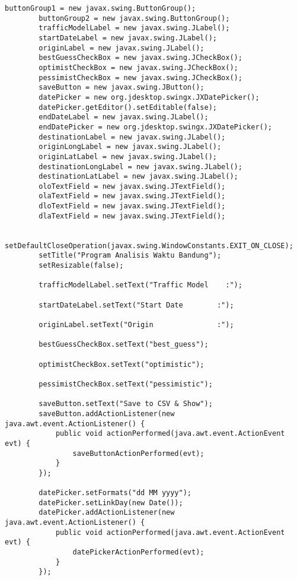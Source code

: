 \begin{lstlisting}[caption= main.java]
        buttonGroup1 = new javax.swing.ButtonGroup();
        buttonGroup2 = new javax.swing.ButtonGroup();
        trafficModelLabel = new javax.swing.JLabel();
        startDateLabel = new javax.swing.JLabel();
        originLabel = new javax.swing.JLabel();
        bestGuessCheckBox = new javax.swing.JCheckBox();
        optimistCheckBox = new javax.swing.JCheckBox();
        pessimistCheckBox = new javax.swing.JCheckBox();
        saveButton = new javax.swing.JButton();
        datePicker = new org.jdesktop.swingx.JXDatePicker();
        datePicker.getEditor().setEditable(false);
        endDateLabel = new javax.swing.JLabel();
        endDatePicker = new org.jdesktop.swingx.JXDatePicker();
        destinationLabel = new javax.swing.JLabel();
        originLongLabel = new javax.swing.JLabel();
        originLatLabel = new javax.swing.JLabel();
        destinationLongLabel = new javax.swing.JLabel();
        destinationLatLabel = new javax.swing.JLabel();
        oloTextField = new javax.swing.JTextField();
        olaTextField = new javax.swing.JTextField();
        dloTextField = new javax.swing.JTextField();
        dlaTextField = new javax.swing.JTextField();

        setDefaultCloseOperation(javax.swing.WindowConstants.EXIT_ON_CLOSE);
        setTitle("Program Analisis Waktu Bandung");
        setResizable(false);

        trafficModelLabel.setText("Traffic Model    :");

        startDateLabel.setText("Start Date        :");

        originLabel.setText("Origin               :");

        bestGuessCheckBox.setText("best_guess");

        optimistCheckBox.setText("optimistic");

        pessimistCheckBox.setText("pessimistic");

        saveButton.setText("Save to CSV & Show");
        saveButton.addActionListener(new java.awt.event.ActionListener() {
            public void actionPerformed(java.awt.event.ActionEvent evt) {
                saveButtonActionPerformed(evt);
            }
        });

        datePicker.setFormats("dd MM yyyy");
        datePicker.setLinkDay(new Date());
        datePicker.addActionListener(new java.awt.event.ActionListener() {
            public void actionPerformed(java.awt.event.ActionEvent evt) {
                datePickerActionPerformed(evt);
            }
        });


\end{lstlisting}

